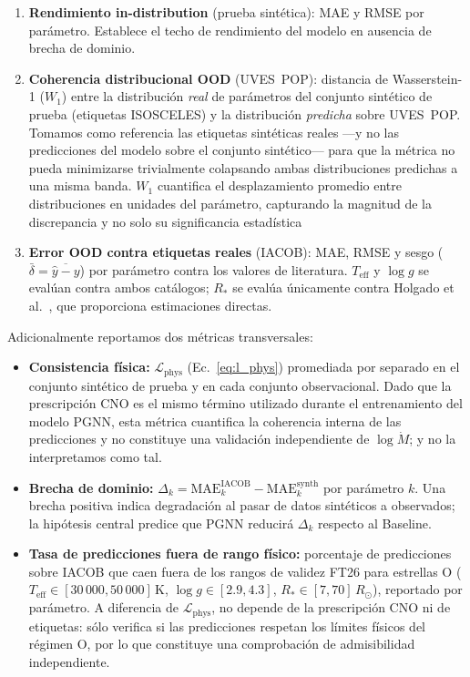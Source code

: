 \documentclass[sigconf,ACM]{acmart}
\begin{document}
\begin{enumerate}
  \item \textbf{Rendimiento in-distribution} (prueba sintética): MAE y RMSE
    por parámetro. Establece el techo de rendimiento del modelo en ausencia de
    brecha de dominio.

  \item \textbf{Coherencia distribucional OOD} (UVES~POP): distancia de
    Wasserstein-1 ($W_1$) entre la distribución \emph{real} de parámetros del
    conjunto sintético de prueba (etiquetas ISOSCELES) y la distribución
    \emph{predicha} sobre UVES~POP. Tomamos como referencia las etiquetas
    sintéticas reales ---y no las predicciones del modelo sobre el conjunto
    sintético--- para que la métrica no pueda minimizarse trivialmente colapsando
    ambas distribuciones predichas a una misma banda. $W_1$ cuantifica
    el desplazamiento promedio entre distribuciones en unidades del parámetro, capturando la magnitud de la discrepancia y no solo su significancia estadística

  \item \textbf{Error OOD contra etiquetas reales} (IACOB): MAE, RMSE y sesgo
    ($\bar{\delta} = \overline{\hat{y} - y}$) por parámetro contra los valores
    de literatura. $T_{\mathrm{eff}}$ y $\log g$ se evalúan contra ambos
    catálogos; $R_*$ se evalúa únicamente contra Holgado et
    al.~\cite{Holgado2025}, que proporciona estimaciones directas.
\end{enumerate}

Adicionalmente reportamos dos métricas transversales:

\begin{itemize}
  \item \textbf{Consistencia física:} $\mathcal{L}_{\mathrm{phys}}$ (Ec.~\ref{eq:l_phys}) promediada por separado en el conjunto sintético de prueba y en cada conjunto observacional. Dado que la prescripción CNO es el mismo término utilizado durante el entrenamiento del modelo PGNN, esta métrica cuantifica la coherencia interna de las predicciones y no constituye una validación independiente de $\log \dot{M}$; y no la interpretamos como tal.

  \item \textbf{Brecha de dominio:}
    $\Delta_k = \mathrm{MAE}_k^{\mathrm{IACOB}} -
    \mathrm{MAE}_k^{\mathrm{synth}}$ por parámetro $k$. Una brecha positiva
    indica degradación al pasar de datos sintéticos a observados; la hipótesis central predice que PGNN reducirá $\Delta_k$ respecto al Baseline.

  \item \textbf{Tasa de predicciones fuera de rango físico:} porcentaje de
    predicciones sobre IACOB que caen fuera de los rangos de validez FT26 para
    estrellas O ($T_{\mathrm{eff}}\in[30\,000,50\,000]$\,K, $\log g\in[2.9,4.3]$,
    $R_*\in[7,70]\,R_\odot$), reportado por parámetro. A diferencia de
    $\mathcal{L}_{\mathrm{phys}}$, no depende de la prescripción CNO ni de
    etiquetas: sólo verifica si las predicciones respetan los límites físicos del
    régimen O, por lo que constituye una comprobación de admisibilidad independiente.
\end{itemize}
    
\end{document}
